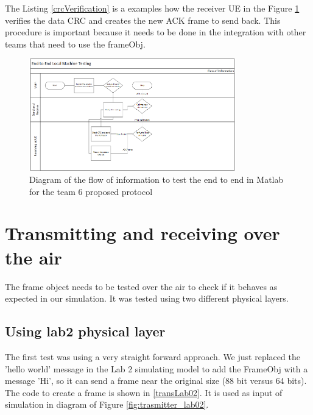 The Listing \ref{crcVerification} is a examples how the receiver UE in the Figure \ref{fig:endendDiagram} verifies the data CRC and creates the new ACK frame to send back.
This procedure is important because it needs to be done in the integration with other teams that need to use the frameObj.     





\begin{figure}[ht]
    \centering
    \includegraphics[width=0.8\textwidth]{flowEndtoEnd.PNG}
    \caption{Diagram of the flow of information to test the end to end in Matlab for the team 6 proposed protocol}
    \label{fig:endendDiagram}
\end{figure} 

\section{Transmitting and receiving over the air}
The frame object needs to be tested over the air to check if it behaves as expected in our simulation. 
It was tested using two different physical layers. 
\subsection{Using lab2 physical layer}

The first test was using a very straight forward approach. We just replaced the 'hello world' message in the Lab 2 
simulating model to add the FrameObj with a message 'Hi', so it can send a frame near the original size (88 bit versus 64 bits).
The code to create a frame is shown in \ref{transLab02}. It is used as input of simulation in diagram of Figure \ref{fig:trasmitter_lab02}.




